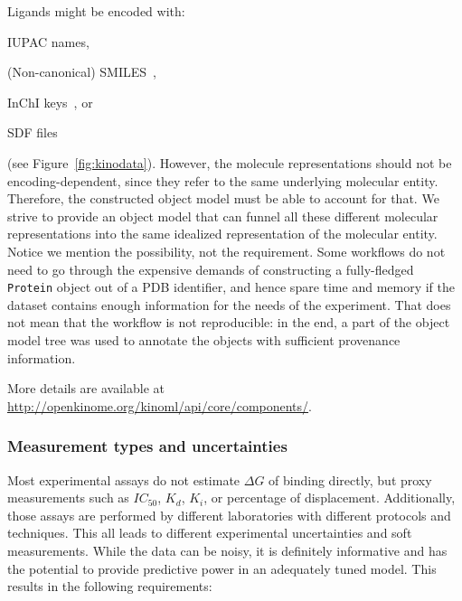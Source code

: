 \documentclass[9pt,lineno]{elife}
\begin{document}
Ligands might be encoded with:

\begin{enumerate*}[label=(\roman*)]
    \item IUPAC names,
    \item (Non-canonical) SMILES~\cite{weininger_1988_JChemInfComputSci},
    \item InChI keys~\cite{heller_2013_JCheminform}, or
    \item SDF files
\end{enumerate*}

(see Figure~\ref{fig:kinodata}). However, the molecule representations should not be encoding-dependent, since they refer to the same underlying molecular entity. Therefore, the constructed object model must be able to account for that. We strive to provide an object model that can funnel all these different molecular representations into the same idealized representation of the molecular entity. Notice we mention the possibility, not the requirement. Some workflows do not need to go through the expensive demands of constructing a fully-fledged \texttt{Protein} object out of a PDB identifier, and hence spare time and memory if the dataset contains enough information for the needs of the experiment. That does not mean that the workflow is not reproducible: in the end, a part of the object model tree was used to annotate the objects with sufficient provenance information.

More details are available at \href{http://openkinome.org/kinoml/api/core/components/}{http://openkinome.org/kinoml/api/core/components/}.

\subsubsection{Measurement types and uncertainties}

Most experimental assays do not estimate $\Delta G$ of binding directly, but proxy measurements such as $IC_{50}$, $K_d$, $K_i$, or percentage of displacement. Additionally, those assays are performed by different laboratories with different protocols and techniques. This all leads to different experimental uncertainties and soft measurements. While the data can be noisy, it is definitely informative and has the potential to provide predictive power in an adequately tuned model.
This results in the following requirements:
\end{document}

